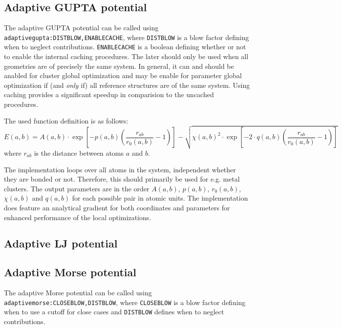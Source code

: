 \documentclass[a4paper,10pt]{scrbook}
\begin{document}
\subsection{Adaptive GUPTA potential}
The adaptive GUPTA potential can be called using
\texttt{adaptivegupta:DISTBLOW,ENABLECACHE}, where \texttt{DISTBLOW} is a blow
factor defining when to neglect contributions. \texttt{ENABLECACHE} is a boolean
defining whether or not to enable the internal caching procedures. The later
should only be used when all geometries are of precisely the same system. In
general, it can and should be anabled for cluster global optimization and may be
enable for parameter global optimization if (and \emph{only} if) all reference
structures are of the same system. Using caching provides a significant speedup
in comparision to the uncached procedures.

The used function definition is as follows:
\begin{equation}
E(a,b)=A(a,b)\cdot
\exp{\left[-p(a,b)\left(\dfrac{r_{ab}}{r_0(a,b)}-1\right)\right]}
-\sqrt{\chi(a,b)^2\cdot\exp{\left[-2\cdot q(a,b)
\left(\dfrac{r_{ab}}{r_0(a,b)}-1\right)\right]}}
\end{equation}
where $r_{ab}$ is the distance between atoms $a$ and $b$.


The implementation loops over all atoms in the system, independent whether they
are bonded or not. Therefore, this should primarily be used for e.g. metal
clusters. The output parameters are in the order $A(a,b)$, $p(a,b)$, $r_0(a,b)$,
$\chi(a,b)$ and $q(a,b)$ for each possible pair in atomic units. The
implementation does feature an analytical gradient for both coordinates and
parameters for enhanced performance of the local optimizations.


\subsection{Adaptive LJ potential}

\subsection{Adaptive Morse potential}
The adaptive Morse potential can be called using
\texttt{adaptivemorse:CLOSEBLOW,DISTBLOW}, where \texttt{CLOSEBLOW} is a blow 
factor defining when to use a cutoff for close cases and \texttt{DISTBLOW}
defines when to neglect contributions.
\end{document}
